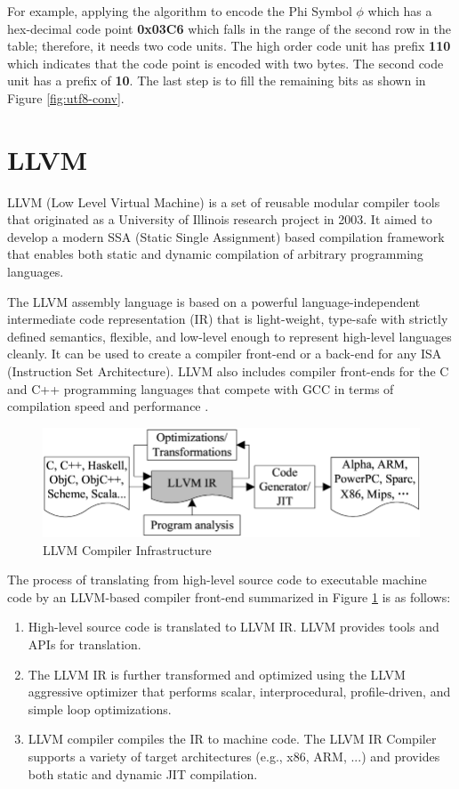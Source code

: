 For example, applying the algorithm to encode the Phi Symbol $\phi$ which has a hex-decimal code point \textbf{0x03C6} which falls in the range of the second row in the table; therefore, it needs two code units. The high order code unit has prefix \textbf{110} which indicates that the code point is encoded with two bytes. The second code unit has a prefix of \textbf{10}. The last step is to fill the remaining bits as shown in Figure \ref{fig:utf8-conv}.

\section{LLVM}
LLVM (Low Level Virtual Machine) \cite{llvm} is a set of reusable modular compiler tools that originated as a University of Illinois research project in 2003. It aimed to develop a modern SSA (Static Single Assignment) based compilation framework that enables both static and dynamic compilation of arbitrary programming languages.

The LLVM assembly language is based on a powerful language-independent intermediate code representation (IR) that is light-weight, type-safe with strictly defined semantics, flexible, and low-level enough to represent high-level languages cleanly. It can be used to create a compiler front-end or a back-end for any ISA (Instruction Set Architecture). LLVM also includes compiler front-ends for the C and C++ programming languages that compete with GCC in terms of compilation speed and performance \cite{llvmgcc}.

\begin{figure}[ht]
\includegraphics[width=\textwidth]{imgs/llvm-arch.png}
\caption[LLVM Compiler Infrastructure]{LLVM Compiler Infrastructure \cite{llvminfra}}\label{fig:llvminfra}
\end{figure}

The process of translating from high-level source code to executable machine code by an LLVM-based compiler front-end summarized in Figure \ref{fig:llvminfra} is as follows:
\begin{enumerate}
    \item High-level source code is translated to LLVM IR. LLVM provides tools and APIs for translation.
    \item The LLVM IR is further transformed and optimized using the LLVM aggressive optimizer that performs scalar, interprocedural, profile-driven, and simple loop optimizations.
    \item LLVM compiler compiles the IR to machine code. The LLVM IR Compiler supports a variety of target architectures (e.g., x86, ARM, ...) and provides both static and dynamic JIT compilation.
\end{enumerate}

